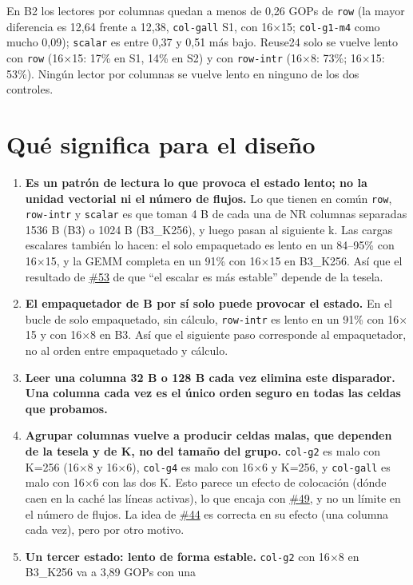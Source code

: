 \documentclass[10pt,a4paper]{article}
\newcommand{\iss}[1]{\href{https://github.com/JieGH/RVV_code_gen_via_MLIR_xDSL/issues/#1}{\##1}}
\newcommand{\key}[1]{\textbf{\textcolor{blue!55!black}{#1}}}  %
\begin{document}
En B2 los lectores por columnas quedan a menos de 0,26 GOPs de \texttt{row} (la mayor diferencia es 12,64 frente a 12,38,
\texttt{col-gall} S1, con 16$\times$15; \texttt{col-g1-m4} como mucho 0,09); \texttt{scalar} es entre 0,37 y 0,51 más bajo. Reuse24
solo se vuelve lento con \texttt{row} (16$\times$15: 17\% en S1, 14\% en S2) y con \texttt{row-intr} (16$\times$8: 73\%;
16$\times$15: 53\%). Ningún lector por columnas se vuelve lento en ninguno de los dos controles.

\section{Qué significa para el diseño}
\label{sec:insight}
\begin{enumerate}
  \item \textbf{Es un patrón de lectura lo que provoca el estado lento; no la unidad vectorial ni el número de flujos.} Lo que tienen
  en común \texttt{row}, \texttt{row-intr} y \texttt{scalar} es que toman 4 B de cada una de NR columnas separadas 1536 B (B3) o
  1024 B (B3\_K256), y luego pasan al siguiente k. Las cargas escalares también lo hacen: el solo empaquetado es lento en un 84--95\%
  con 16$\times$15, y la GEMM completa en un 91\% con 16$\times$15 en B3\_K256. Así que el resultado de \iss{53} de que ``el escalar
  es más estable'' depende de la tesela.
  \item \textbf{El empaquetador de B por sí solo puede provocar el estado.} En el bucle de solo empaquetado, sin cálculo,
  \texttt{row-intr} es lento en un 91\% con 16$\times$15 y con 16$\times$8 en B3. Así que el siguiente paso corresponde al
  empaquetador, no al orden entre empaquetado y cálculo.
  \item \textbf{Leer una columna 32 B o 128 B cada vez elimina este disparador.} \key{Una columna cada vez es el único orden seguro en todas
  las celdas que probamos.}
  \item \textbf{Agrupar columnas vuelve a producir celdas malas, que dependen de la tesela y de K, no del tamaño del grupo.}
  \texttt{col-g2} es malo con K=256 (16$\times$8 y 16$\times$6), \texttt{col-g4} es malo con 16$\times$6 y K=256, y \texttt{col-gall}
  es malo con 16$\times$6 con las dos K. Esto parece un efecto de colocación (dónde caen en la caché las líneas activas), lo que
  encaja con \iss{49}, y no un límite en el número de flujos. La idea de \iss{44} es correcta en su efecto (una columna cada vez), pero
  por otro motivo.
  \item \textbf{Un tercer estado: lento de forma estable.} \texttt{col-g2} con 16$\times$8 en B3\_K256 va a 3,89 GOPs con una

\end{enumerate}
\end{document}
